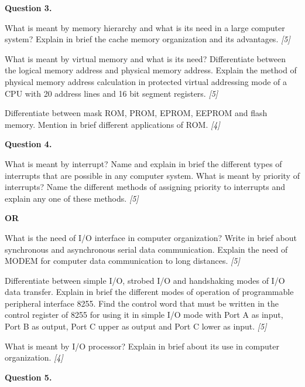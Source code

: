 \documentclass[11pt,a4paper]{article}
\newcommand{\pts}[1]{\hfill   \textit{[#1]}}
\begin{document}
\medskip


\noindent   \textbf{Question 3.}

\begin{parts}
  \item What is meant by memory hierarchy and what is its need in a large computer system? Explain in brief the cache memory organization and its advantages. \pts{5}
  \item What is meant by virtual memory and what is its need? Differentiate between the logical memory address and physical memory address. Explain the method of physical memory address calculation in protected virtual addressing mode of a CPU with 20 address lines and 16 bit segment registers. \pts{5}
  \item Differentiate between mask ROM, PROM, EPROM, EEPROM and flash memory. Mention in brief different applications of ROM. \pts{4}
\end{parts}

\medskip


\noindent   \textbf{Question 4.}

\begin{parts}
  \item What is meant by interrupt? Name and explain in brief the different types of interrupts that are possible in any computer system. What is meant by priority of interrupts? Name the different methods of assigning priority to interrupts and explain any one of these methods. \pts{5}
  \centerline{   \textbf{OR}}
  What is the need of I/O interface in computer organization? Write in brief about synchronous and asynchronous serial data communication. Explain the need of MODEM for computer data communication to long distances. \pts{5}
  \item Differentiate between simple I/O, strobed I/O and handshaking modes of I/O data transfer. Explain in brief the different modes of operation of programmable peripheral interface 8255. Find the control word that must be written in the control register of 8255 for using it in simple I/O mode with Port A as input, Port B as output, Port C upper as output and Port C lower as input. \pts{5}
  \item What is meant by I/O processor? Explain in brief about its use in computer organization. \pts{4}
\end{parts}

\medskip


\noindent   \textbf{Question 5.}
\end{document}
